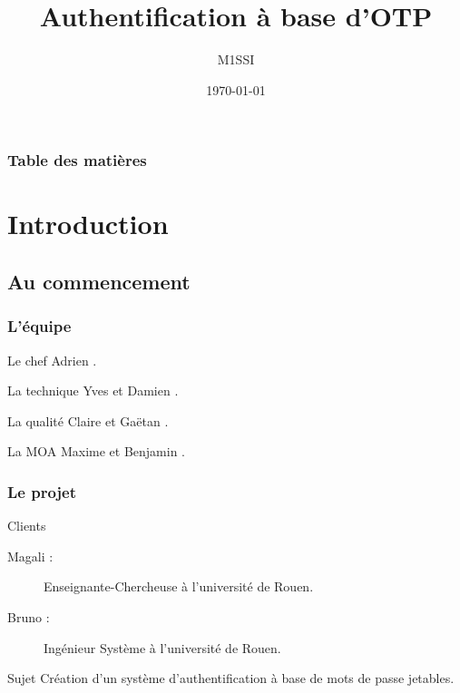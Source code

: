 \documentclass[xcolor=table]{beamer}
\title{Authentification \`{a} base d'OTP}
\author{M1SSI}
\institute[Université de Rouen] {
Université de Rouen \\
\medskip
}
\date{\today}
\begin{document}
\begin{frame}
\titlepage
\end{frame}

\begin{frame}
\frametitle{Table des matières}
\tableofcontents
\end{frame}

\section{Introduction}
\subsection{Au commencement}
\begin{frame}
\frametitle{L'équipe}
\begin{block}{Le chef}
Adrien .
\end{block}
\begin{block}{La technique}
Yves  et Damien .
\end{block}
\begin{block}{La qualité}
Claire  et Gaëtan .
\end{block}
\begin{block}{La MOA}
Maxime  et Benjamin .
\end{block}
\end{frame}


\begin{frame}
\frametitle{Le projet}

\begin{block}{Clients}
\begin{description}
\item[Magali :] Enseignante-Chercheuse à l'université de Rouen.\\
\item[Bruno :] Ingénieur Système à l'université de Rouen.
\end{description}
\end{block}

\begin{block}{Sujet}
Création d'un système d'authentification à base de mots de passe jetables.
\end{block}
\end{frame}
\end{document}
